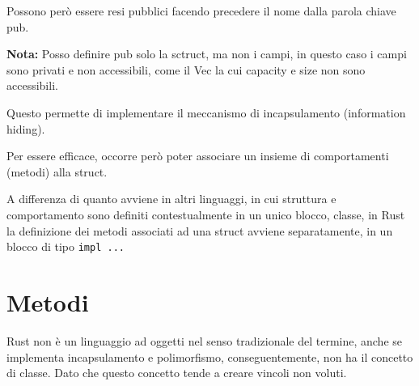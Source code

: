 Possono però essere resi pubblici facendo precedere il nome dalla parola chiave pub.\newline


\noindent
\begin{tcolorbox}
  \textbf{Nota:} Posso definire pub solo la sctruct, ma non i campi, in questo caso i campi sono
  privati e non accessibili, come il Vec la cui capacity e size non sono accessibili.
\end{tcolorbox}


Questo permette di implementare il meccanismo di incapsulamento (information
hiding).



Per essere efficace, occorre però poter associare un insieme di comportamenti
(metodi) alla struct.

A differenza di quanto avviene in altri linguaggi, in cui struttura e comportamento sono definiti
contestualmente in un unico blocco, classe, in Rust la definizione dei metodi associati ad una struct
avviene separatamente, in un blocco di tipo \texttt{impl ...}

\section{Metodi}

Rust non è un linguaggio ad oggetti nel senso tradizionale del termine, anche se implementa
incapsulamento e polimorfismo, conseguentemente, non ha il concetto di classe.
Dato che questo concetto tende a creare vincoli non voluti.







